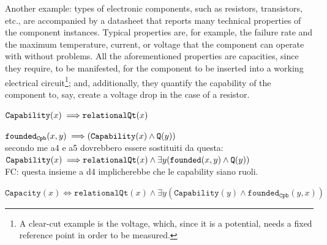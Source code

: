 \documentclass[sw]{iosart2x}
\newcommand{\bflist}{\begin{list}{}{\setlength{\topsep}{2mm}\setlength{\partopsep}{0mm}\setlength{\parsep}{0mm}\setlength{\leftmargin}{9mm}\setlength{\labelwidth}{8mm}}}
\newcommand{\eflist}{\end{list}}
\newcommand{\AxLabel}{\textrm{a}}
\newcounter{cntax}
\newcommand{\myax}[1]{\refstepcounter{cntax}\begin{small}{\bf \AxLabel\thecntax\label{ax:#1}}\end{small}}
\newcommand{\generalStyle}[1]{\texttt{#1}}
\newcommand{\biRel}[3]{\generalStyle{#1}(#2,#3)}
\newcommand{\uniRel}[2]{\generalStyle{#1}(#2)}
\newcommand{\biRelPar}[4]{\generalStyle{#1}_{\generalStyle{#4}}(#2,#3)}
\newcommand{\myiff}{\Longleftrightarrow}
\newcommand{\myfi}{\hspace{0.9mm} \Longrightarrow}
\newcommand{\DOLCEQuality}[1]{\uniRel{Q}{#1}}
\newcommand{\Capability}[1]{\uniRel{Capability}{#1}}
\newcommand{\Capacity}[1]{\uniRel{Capacity}{#1}}
\newcommand{\RelationalQuality}[1]{\uniRel{relationalQt}{#1}}
\newcommand{\founded}[2]{\biRel{\foundedTerm{passive}}{#1}{#2}}
\newcommand{\foundedCapab}[2]{\biRelPar{founded}{#1}{#2}{Cpb}}
\newcommand{\foundedTerm}[1]{%
  \ifthenelse{\equal{#1}{passive}}{founded}{%
    \ifthenelse{\equal{#1}{verb}}{found}{%
      \ifthenelse{\equal{#1}{gerund}}{founding}{%
        ERROR!%
      }%
    }%
  }%
}
\newcommand{\TODO}[1]{{\color{red} #1}}
\begin{document}
Another example: types of electronic components, such as resistors, transistors, etc., are accompanied by a datasheet that reports many technical properties of the component instances. 
Typical properties are, for example, the failure rate and the maximum temperature, current, or voltage that the component can operate with without problems. 
All the aforementioned properties are capacities, since they require, to be manifested, for the component to be inserted into a working electrical circuit\footnote{A clear-cut example is the voltage, which, since it is a potential, needs a fixed reference point in order to be measured.}; and, additionally, they quantify the capability of the component to, say, create a voltage drop in the case of a resistor. 
\bflist
\item[\myax{subsumptionCapab}] $ \Capability{x} \myfi  \RelationalQuality{x} $ 
\item[\myax{foundedCapabRange}] $ \foundedCapab{x}{y} \myfi (\Capability{x} \land \DOLCEQuality{y}) $\\
\TODO{secondo me a4 e a5 dovrebbero essere sostituiti da questa:\\
$\Capability{x} \myfi \RelationalQuality{x} \land  \exists y (\founded{x}{y} \land \DOLCEQuality{y}) $\\
FC: questa insieme a d4 implicherebbe che le capability siano ruoli.}
\item[\myax{subsumptionCapac}] $ \Capacity{x} \myiff  \RelationalQuality{x} \land \exists y(\Capability{y} \land \foundedCapab{y}{x}) $  %
\eflist
\end{document}
